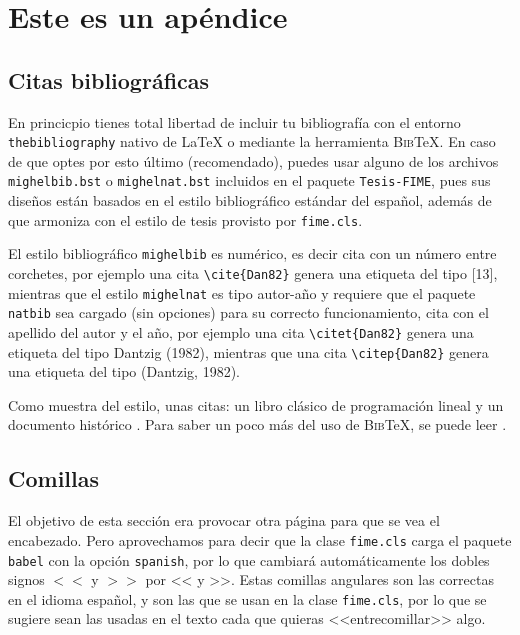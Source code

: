\chapter{Este es un apéndice}
\label{apendicecaso}
\section{Citas bibliográficas}

En princicpio tienes total libertad de incluir tu bibliografía con el entorno {\tt thebibliography} nativo de \LaTeX{} o mediante la herramienta \textsc{Bib}\TeX. En caso de que optes por esto último (recomendado), puedes usar alguno de los archivos {\tt mighelbib.bst} o {\tt mighelnat.bst} incluidos en el paquete {\tt Tesis-FIME}, pues sus diseños están basados en el estilo bibliográfico estándar del español, además de que armoniza con el estilo de tesis provisto por {\tt fime.cls}.

El estilo bibliográfico {\tt mighelbib} es numérico, es decir cita con un número entre corchetes, por ejemplo una cita \verb+\cite{Dan82}+ genera una etiqueta del tipo [13], mientras que el estilo {\tt mighelnat} es tipo autor-año y requiere que el paquete {\tt natbib} sea cargado (sin opciones) para su correcto funcionamiento, cita con el apellido del autor y el año, por ejemplo una cita \verb+\citet{Dan82}+ genera una etiqueta del tipo Dantzig (1982), mientras que una cita \verb+\citep{Dan82}+ genera una etiqueta del tipo (Dantzig, 1982).

Como muestra del estilo, unas citas: un libro clásico de programación lineal \citep{Baz04} y un documento histórico \citep{Dan82}. Para saber un poco más del uso de \textsc{Bib}\TeX, se puede leer \citep{Mat11}.

\section{Comillas}

El objetivo de esta sección era provocar otra página para que se vea el encabezado. Pero aprovechamos para decir que la clase {\tt fime.cls} carga el paquete {\tt babel} con la opción {\tt spanish}, por lo que cambiará automáticamente los dobles signos $<<$ y $>>$ por << y >>. Estas comillas angulares son las correctas en el idioma español, y son las que se usan en la clase {\tt fime.cls}, por lo que se sugiere sean las usadas en el texto cada que quieras <<entrecomillar>> algo.